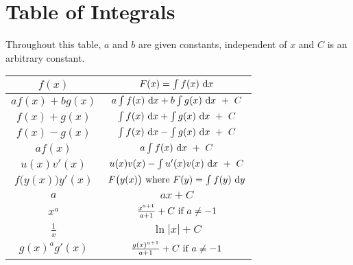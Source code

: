 
\chapter{Table of Integrals}\label{app integral}

Throughout this table, $a$ and $b$ are given constants, independent of $x$
and $C$ is an arbitrary constant.



\begin{center}

\renewcommand{\arraystretch}{2.5}
     \begin{tabular}{|c|c|}
        \hline
    $f(x)$ & $ F(x)=\int f(x)\ \mathrm{d}x$ \\ 
        \hline\hline
$af(x)+bg(x)$ & $a\int f(x)\ \dee{x}+b\int g(x)\ \dee{x}\ +\ C$ \\  \hline
$f(x)+g(x)$ & $\int f(x)\ \dee{x}+\int g(x)\ \dee{x}\ +\ C$ \\  \hline
$f(x)-g(x)$ & $\int f(x)\ \dee{x}-\int g(x)\ \dee{x}\ +\ C$ \\  \hline
$af(x)$ & $a\int f(x)\ \dee{x}\ +\ C$ \\  \hline\hline
$u(x)v'(x)$ & $ u(x)v(x)-\int u'(x)v(x)\ \mathrm{d}x\ +\ C$ \\  \hline\hline
$f\big(y(x)\big)y'(x)$ & $ F\big(y(x)\big)\hbox{ where }F(y)=\int f(y)\ \dee{y}$ \\  \hline\hline
$a$ & $ax+C$ \\  \hline
$x^a$ & $\frac{x^{a+1}}{a+1}+C\hbox{ if }a\ne-1$ \\  \hline
$\frac{1}{x}$ & $\ln|x|+C$ \\  \hline
$g(x)^ag'(x)$ & $\frac{g(x)^{a+1}}{a+1}+C\hbox{ if }a\ne -1$ \\  \hline\hline
     \end{tabular}


\end{center}
